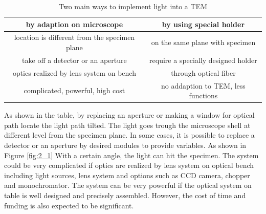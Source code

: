\begin{table}[ht]
\centering %
\begin{tabular}{|c|c|} %

\hline %
by adaption on microscope & by using special holder \\ [0.5ex] %
\hline %
location is different from the specimen plane & on the same plane with specimen \\[1.5ex] %
take off a detector or an aperture & require a specially designed holder \\[1.5ex]%
optics realized by lens system on bench & through optical fiber \\[1.5ex]
complicated, powerful, high cost & no addaption to TEM, less functions\\[1.5ex]
\hline %
\end{tabular}
\caption{Two main ways to implement light into a TEM} %

\label{table2.1} %
\end{table}

As shown in the table, by replacing an aperture or making a window for optical path locate the light path tilted. The light goes trough the microscope shell at different level from the specimen plane. In some cases, it is possible to replace a detector or an aperture by desired modules to provide variables. As shown in Figure \ref{fig:2_1} With a certain angle, the light can hit the specimen. The system could be very complicated if optics are realized by lens system on optical bench including light sources, lens system and options such as CCD camera, chopper and monochromator. The system can be very powerful if the optical system on table is well designed and precisely assembled. However, the cost of time and funding is also expected to be significant. \\


